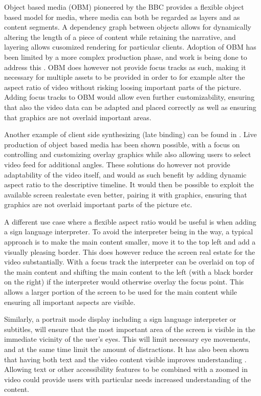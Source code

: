 \documentclass[sigconf, review=false]{acmart}
\begin{document}
Object based media (OBM) pioneered by the BBC provides a flexible object based
model for media, where media can both be regarded as layers and as content
segments. A dependency graph between objects allows for dynamically altering
the length of a piece of content while retaining the narrative, and layering
allows cusomized rendering for particular clients. Adoption of OBM has been
limited by a more complex production phase, and work is being done to address
this \cite{8352916}. OBM does however not provide focus tracks as such,
making it necessary for multiple assets to be provided in order to for
example alter the aspect ratio of video without risking loosing important
parts of the picture. Adding focus tracks to OBM would allow even further
customizability, ensuring that also the video data can be adapted and placed
correctly as well as ensuring that graphics are not overlaid important
areas.

Another example of client side synthesizing (late binding) can be found
in \cite{JIT_video}. Live production of object based media has been shown
possible, with a focus on controlling and customizing overlay graphics while
also allowing users to select video feed for additional angles\cite
{10.1145/3209280.3209528}. These solutions do however not provide
adaptability of the video itself, and would as such benefit by adding dynamic
aspect ratio to the descriptive timeline. It would then be possible to
exploit the available screen realestate even better, pairing it with
graphics, ensuring that graphics are not overlaid important parts of the
picture etc.

A different use case where a flexible aspect ratio would be useful is when
adding a sign language interpreter. To avoid the interpreter being in the
way, a typical approach is to make the main content smaller, move it to the
top left and add a visually pleasing border. This does however reduce the
screen real estate for the video substantially. With a focus track the
interpreter can be overlaid on top of the main content and shifting the main
content to the left (with a black border on the right) if the interpreter
would otherwise overlay the focus point. This allows a larger portion of the
screen to be used for the main content while ensuring all important aspects
are visible.

Similarly, a portrait mode display including a sign language interpreter or
subtitles, will ensure that the most important area of the screen is visible
in the immediate vicinity of the user's eyes. This will limit necessary eye
movements, and at the same time limit the amount of distractions. It has also
been shown that having both text and the video content visible improves
understanding \cite{eyetracking}. Allowing text or other accessibility
features to be combined with a zoomed in video could provide users with
particular needs increased understanding of the content.
\end{document}
